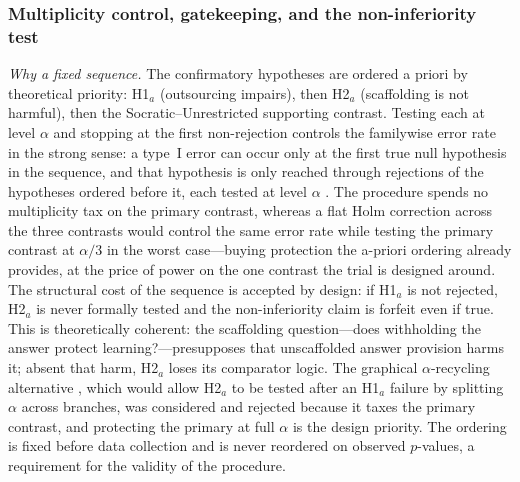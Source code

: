 \subsubsection{Multiplicity control, gatekeeping, and the non-inferiority test}
\label{app:multiplicity}
\emph{Why a fixed sequence.} The confirmatory hypotheses are ordered a priori by theoretical priority: H1$_a$ (outsourcing impairs), then H2$_a$ (scaffolding is not harmful), then the Socratic--Unrestricted supporting contrast. Testing each at level $\alpha$ and stopping at the first non-rejection controls the familywise error rate in the strong sense: a type~I error can occur only at the first true null hypothesis in the sequence, and that hypothesis is only reached through rejections of the hypotheses ordered before it, each tested at level $\alpha$ \parencite{bauer1991,maurer1995,westfall2001,dmitrienko2013,fda2017}. The procedure spends no multiplicity tax on the primary contrast, whereas a flat Holm correction across the three contrasts \parencite{holm1979} would control the same error rate while testing the primary contrast at $\alpha/3$ in the worst case---buying protection the a-priori ordering already provides, at the price of power on the one contrast the trial is designed around. The structural cost of the sequence is accepted by design: if H1$_a$ is not rejected, H2$_a$ is never formally tested and the non-inferiority claim is forfeit even if true. This is theoretically coherent: the scaffolding question---does withholding the answer protect learning?---presupposes that unscaffolded answer provision harms it; absent that harm, H2$_a$ loses its comparator logic. The graphical $\alpha$-recycling alternative \parencite{bretz2009}, %
which would allow H2$_a$ to be tested after an H1$_a$ failure by splitting $\alpha$ across branches, was considered and rejected because it taxes the primary contrast, and protecting the primary at full $\alpha$ is the design priority. The ordering is fixed before data collection and is never reordered on observed $p$-values, a requirement for the validity of the procedure.

